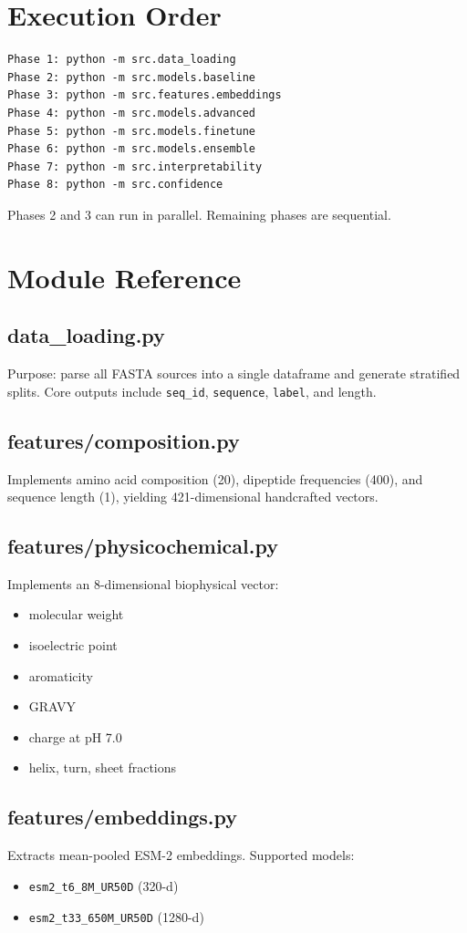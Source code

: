 \documentclass[11pt,a4paper]{article}
\begin{document}
\section{Execution Order}
\begin{verbatim}
Phase 1: python -m src.data_loading
Phase 2: python -m src.models.baseline
Phase 3: python -m src.features.embeddings
Phase 4: python -m src.models.advanced
Phase 5: python -m src.models.finetune
Phase 6: python -m src.models.ensemble
Phase 7: python -m src.interpretability
Phase 8: python -m src.confidence
\end{verbatim}

Phases 2 and 3 can run in parallel. Remaining phases are sequential.

\section{Module Reference}
\subsection{data\_loading.py}
Purpose: parse all FASTA sources into a single dataframe and generate stratified splits.
Core outputs include \texttt{seq\_id}, \texttt{sequence}, \texttt{label}, and length.

\subsection{features/composition.py}
Implements amino acid composition (20), dipeptide frequencies (400), and sequence length (1),
yielding 421-dimensional handcrafted vectors.

\subsection{features/physicochemical.py}
Implements an 8-dimensional biophysical vector:
\begin{itemize}
\item molecular weight
\item isoelectric point
\item aromaticity
\item GRAVY
\item charge at pH 7.0
\item helix, turn, sheet fractions
\end{itemize}

\subsection{features/embeddings.py}
Extracts mean-pooled ESM-2 embeddings.
Supported models:
\begin{itemize}
\item \texttt{esm2\_t6\_8M\_UR50D} (320-d)
\item \texttt{esm2\_t33\_650M\_UR50D} (1280-d)
\end{itemize}
\end{document}
